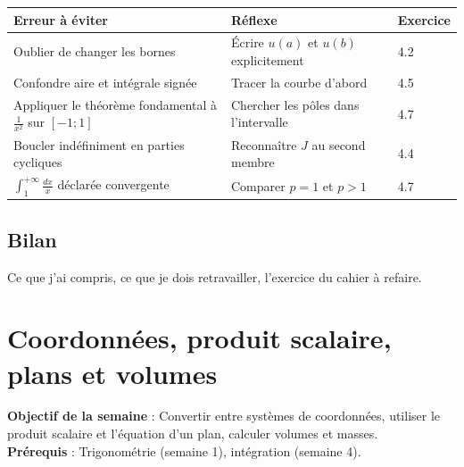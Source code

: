 \documentclass[10.5pt,a4paper]{article}
\newif\ifprof
\newcommand{\synth}{\textsf{\textcolor{ardoise}{(synthèse)}}}
\newcommand{\profonly}[1]{\ifprof #1\fi}
\newcommand{\titrecourant}{Guide de séquence}
\begin{document}
\else
\begin{longtable}{@{}p{7.2cm}p{7.2cm}p{1.6cm}@{}}
\toprule \textbf{Erreur à éviter} & \textbf{Réflexe} & \textbf{Exercice}\\ \midrule\endhead
Oublier de changer les bornes & Écrire $u(a)$ et $u(b)$ explicitement & 4.2\\
Confondre aire et intégrale signée & Tracer la courbe d'abord & 4.5\\
Appliquer le théorème fondamental à $\frac1{x^2}$ sur $[-1;1]$ & Chercher les pôles dans l'intervalle & 4.7\\
Boucler indéfiniment en parties cycliques & Reconnaître $J$ au second membre & 4.4\\
$\int_1^{+\infty}\frac{dx}{x}$ déclarée convergente & Comparer $p=1$ et $p>1$ & 4.7\\
\bottomrule\end{longtable}
\fi
\profonly{\subsection{Différenciation et variante FLE/FLS}
Étayage : arbre de décision de la technique à choisir. Niveaux : 4.1 (socle), 4.4 (intermédiaire), 4.7 (approfondissement). FLE/FLS : lexique primitive/antiderivative, intégration par parties/integration by parts, impropre/improper.
\subsection{Évaluation}
Contrôle du cahier \S4.6 (20 points). Barème et corrigé : voir le cahier. Les causes d'erreur ci-dessus sont des hypothèses didactiques, non des constats \synth.}
\subsection{Bilan}
\ifprof À renseigner après la semaine : notions mal acquises, temps réel, réajustements.\else Ce que j'ai compris, ce que je dois retravailler, l'exercice du cahier à refaire.\fi
\clearpage
\section{Coordonnées, produit scalaire, plans et volumes}
\renewcommand{\titrecourant}{Semaine 5}
\begin{objectif}\textbf{Objectif de la semaine} : Convertir entre systèmes de coordonnées, utiliser le produit scalaire et l'équation d'un plan, calculer volumes et masses.\\\textbf{Prérequis} : Trigonométrie (semaine 1), intégration (semaine 4).\end{objectif}
\end{document}
